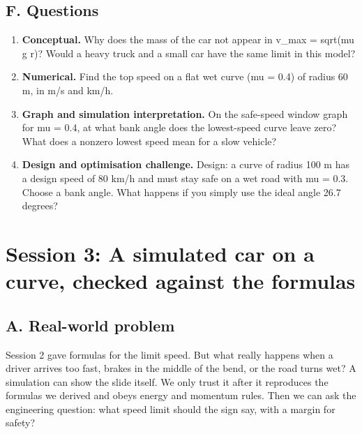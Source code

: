 \documentclass[11pt,a4paper]{article}
\begin{document}
\subsection*{F. Questions}
\begin{enumerate}[nosep]
\item \textbf{Conceptual.} Why does the mass of the car not appear in v\_max = sqrt(mu g r)? Would a heavy truck and a small car have the same limit in this model?
\item \textbf{Numerical.} Find the top speed on a flat wet curve (mu = 0.4) of radius 60 m, in m/s and km/h.
\item \textbf{Graph and simulation interpretation.} On the safe-speed window graph for mu = 0.4, at what bank angle does the lowest-speed curve leave zero? What does a nonzero lowest speed mean for a slow vehicle?
\item \textbf{Design and optimisation challenge.} Design: a curve of radius 100 m has a design speed of 80 km/h and must stay safe on a wet road with mu = 0.3. Choose a bank angle. What happens if you simply use the ideal angle 26.7 degrees?
\end{enumerate}

\section{Session 3: A simulated car on a curve, checked against the formulas}

\subsection*{A. Real-world problem}
Session 2 gave formulas for the limit speed. But what really happens when a driver arrives too fast, brakes in the middle of the bend, or the road turns wet? A simulation can show the slide itself. We only trust it after it reproduces the formulas we derived and obeys energy and momentum rules. Then we can ask the engineering question: what speed limit should the sign say, with a margin for safety?
\end{document}
